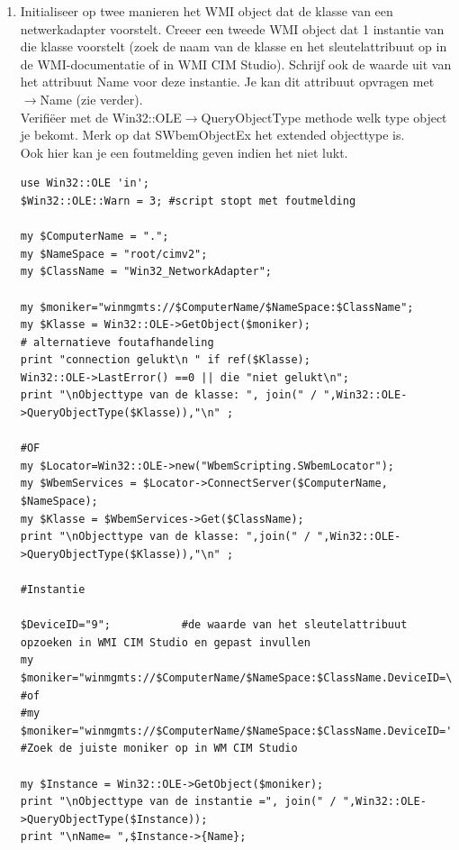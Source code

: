 \documentclass[11pt,a4paper]{report}
\begin{document}
\begin{enumerate}[resume]
	\item Initialiseer op twee manieren het WMI object dat de klasse van een netwerkadapter voorstelt. Creeer een tweede WMI object dat 1 instantie van die klasse voorstelt (zoek de naam van de klasse en het sleutelattribuut op in de WMI-documentatie of in WMI CIM Studio). Schrijf ook de waarde uit van het attribuut Name voor deze instantie. Je kan dit attribuut opvragen met $\rightarrow${Name} (zie verder).
	\\Verifiëer met de Win32::OLE$\rightarrow$QueryObjectType methode welk type object je bekomt. Merk op dat SWbemObjectEx het extended objecttype is.
	\\Ook hier kan je een foutmelding geven indien het niet lukt.
	\newpage
	\begin{lstlisting}
use Win32::OLE 'in';
$Win32::OLE::Warn = 3; #script stopt met foutmelding

my $ComputerName = ".";
my $NameSpace = "root/cimv2";
my $ClassName = "Win32_NetworkAdapter";

my $moniker="winmgmts://$ComputerName/$NameSpace:$ClassName";
my $Klasse = Win32::OLE->GetObject($moniker);
# alternatieve foutafhandeling
print "connection gelukt\n " if ref($Klasse);
Win32::OLE->LastError() ==0 || die "niet gelukt\n";
print "\nObjecttype van de klasse: ", join(" / ",Win32::OLE->QueryObjectType($Klasse)),"\n" ;

#OF
my $Locator=Win32::OLE->new("WbemScripting.SWbemLocator");
my $WbemServices = $Locator->ConnectServer($ComputerName, $NameSpace);
my $Klasse = $WbemServices->Get($ClassName);
print "\nObjecttype van de klasse: ",join(" / ",Win32::OLE->QueryObjectType($Klasse)),"\n" ;

#Instantie

$DeviceID="9";           #de waarde van het sleutelattribuut opzoeken in WMI CIM Studio en gepast invullen
my $moniker="winmgmts://$ComputerName/$NameSpace:$ClassName.DeviceID=\"$DeviceID\"";
#of
#my $moniker="winmgmts://$ComputerName/$NameSpace:$ClassName.DeviceID='$DeviceID'";
#Zoek de juiste moniker op in WM CIM Studio

my $Instance = Win32::OLE->GetObject($moniker);
print "\nObjecttype van de instantie =", join(" / ",Win32::OLE->QueryObjectType($Instance));
print "\nName= ",$Instance->{Name};


\end{lstlisting}
\end{enumerate}
\end{document}

